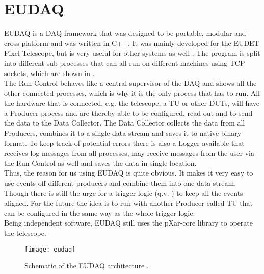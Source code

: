 \section{EUDAQ}
EUDAQ is a \ac{DAQ} framework that was designed to be portable, modular and cross platform and was written in C++. It was mainly developed for the EUDET Pixel Telescope, but is very useful for other systems as well \cite{eudaq}. The program is split into different sub processes that can all run on different machines using \ac{TCP} sockets, which are shown in .\\
The Run Control behaves like a central supervisor of the \ac{DAQ} and shows all the other connected processes, which is why it is the only process that has to run. All the hardware that is connected, e.g. the telescope, a \ac{TU} or other \ac{DUT}s, will have a Producer process and are thereby able to be configured, read out and to send the data to the Data Collector. The Data Collector collects the data from all Producers, combines it to a single data stream and saves it to native binary format. To keep track of potential errors there is also a Logger available that receives log messages from all processes, may receive messages from the user via the Run Control as well and saves the data in single location.\\
Thus, the reason for us using EUDAQ is quite obvious. It makes it very easy to use events off different producers and combine them into one data stream. Though there is still the urge for a trigger logic (q.v. ) to keep all the events aligned. For the future the idea is to run with another Producer called \ac{TU} that can be configured in the same way as the whole trigger logic.\\
Being independent software, EUDAQ still uses the pXar-core library to operate the telescope.
\begin{figure}[ht]
	\texttt{[image: eudaq]}
	\caption{Schematic of the EUDAQ architecture \cite{eudaq}.}
	\label{p16}
\end{figure}
